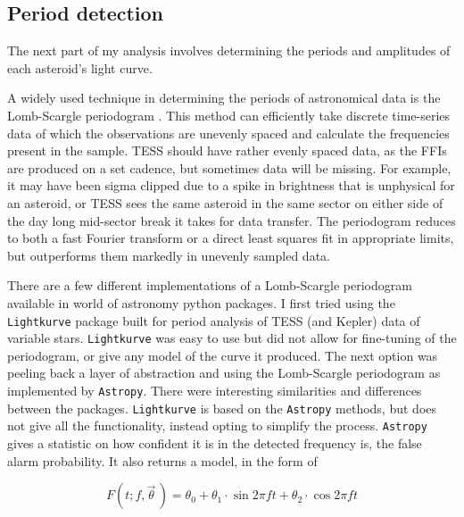 \documentclass{UCreport}
\begin{document}
\subsection{Period detection}\label{SubSec:Periods}


The next part of my analysis involves determining the periods and amplitudes of each asteroid's light curve.

A widely used technique in determining the periods of astronomical data is the Lomb-Scargle periodogram \citep[\citet{Lomb1976,Scargle1982}, but see][for a review]{VanderPlas2018}.
This method can efficiently take discrete time-series data of which the observations are unevenly spaced and calculate the frequencies present in the sample.
TESS should have rather evenly spaced data, as the FFIs are produced on a set cadence, but sometimes data will be missing.
For example, it may have been sigma clipped due to a spike in brightness that is unphysical for an asteroid, or TESS sees the same asteroid in the same sector on either side of the day long mid-sector break it takes for data transfer.
The periodogram reduces to both a fast Fourier transform or a direct least squares fit in appropriate limits, but outperforms them markedly in unevenly sampled data.

There are a few different implementations of a Lomb-Scargle periodogram available in world of astronomy python packages.
I first tried using the \texttt{Lightkurve} \citep{Lightkurve2018} package built for period analysis of TESS (and Kepler) data of variable stars.
\texttt{Lightkurve} was easy to use but did not allow for fine-tuning of the periodogram, or give any model of the curve it produced.
The next option was peeling back a layer of abstraction and using the Lomb-Scargle periodogram as implemented by \texttt{Astropy}\citep[\citet{Astropy2022} but see][for the implementation]{Vanderplas2012,Vanderplas2015}.
There were interesting similarities and differences between the packages.
\texttt{Lightkurve} is based on the \texttt{Astropy} methods, but does not give all the functionality, instead opting to simplify the process.
\texttt{Astropy} gives a statistic on how confident it is in the detected frequency is, the false alarm probability.
It also returns a model, in the form of

\begin{equation}
  \label{Eq:LCModel}
  F(t;f,\vec{\theta}\,) = \theta_0 + \theta_1\cdot\sin{2\pi ft} +\theta_2\cdot\cos{2\pi ft}
\end{equation}
\end{document}
